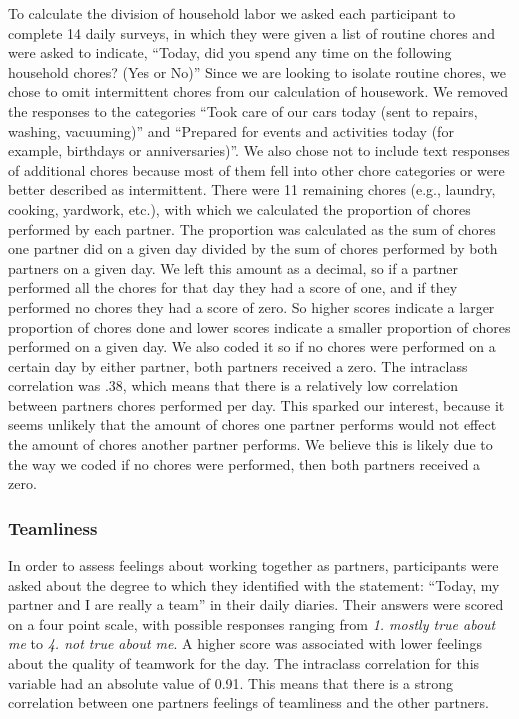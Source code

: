 \documentclass[
  man]{apa6}
\begin{document}
To calculate the division of household labor we asked each participant to complete 14 daily surveys, in which they were given a list of routine chores and were asked to indicate, ``Today, did you spend any time on the following household chores? (Yes or No)'' Since we are looking to isolate routine chores, we chose to omit intermittent chores from our calculation of housework. We removed the responses to the categories ``Took care of our cars today (sent to repairs, washing, vacuuming)'' and ``Prepared for events and activities today (for example, birthdays or anniversaries)''. We also chose not to include text responses of additional chores because most of them fell into other chore categories or were better described as intermittent. There were 11 remaining chores (e.g., laundry, cooking, yardwork, etc.), with which we calculated the proportion of chores performed by each partner. The proportion was calculated as the sum of chores one partner did on a given day divided by the sum of chores performed by both partners on a given day. We left this amount as a decimal, so if a partner performed all the chores for that day they had a score of one, and if they performed no chores they had a score of zero. So higher scores indicate a larger proportion of chores done and lower scores indicate a smaller proportion of chores performed on a given day. We also coded it so if no chores were performed on a certain day by either partner, both partners received a zero. The intraclass correlation was .38, which means that there is a relatively low correlation between partners chores performed per day. This sparked our interest, because it seems unlikely that the amount of chores one partner performs would not effect the amount of chores another partner performs. We believe this is likely due to the way we coded if no chores were performed, then both partners received a zero.

\hypertarget{teamliness}{%
\subsubsection{Teamliness}\label{teamliness}}

In order to assess feelings about working together as partners, participants were asked about the degree to which they identified with the statement: ``Today, my partner and I are really a team'' in their daily diaries. Their answers were scored on a four point scale, with possible responses ranging from \emph{1. mostly true about me} to \emph{4. not true about me}. A higher score was associated with lower feelings about the quality of teamwork for the day. The intraclass correlation for this variable had an absolute value of 0.91. This means that there is a strong correlation between one partners feelings of teamliness and the other partners.
\end{document}
